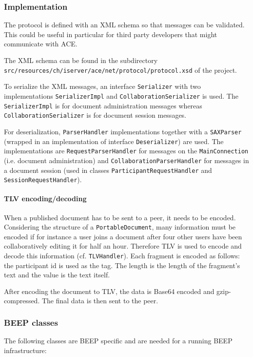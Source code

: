 \subsubsection{Implementation}
The protocol is defined with an XML schema so that messages can be validated. This could be useful in particular for third party developers that might communicate with ACE.

The XML schema can be found in the subdirectory \texttt{src/\-resources/\-ch/\-iserver/\-ace/\-net/\-protocol/\-protocol.xsd} of the project.

To serialize the XML messages, an interface \texttt{Serializer} with two implementations \texttt{SerializerImpl} and \texttt{CollaborationSerializer} is used. The \texttt{SerializerImpl} is for document administration messages whereas \texttt{CollaborationSerializer} is for document session messages.

For deserialization, \texttt{ParserHandler} implementations together with a \texttt{SAXParser} (wrapped in an implementation of interface \texttt{Deserializer}) are used. The implementations are \texttt{RequestParserHandler} for messages on the \texttt{MainConnection} (i.e. document administration) and \texttt{CollaborationParserHandler} for messages in a document session (used in classes \texttt{ParticipantRequestHandler} and \texttt{SessionRequestHandler}).


\paragraph{TLV encoding/decoding}
When a published document has to be sent to a peer, it needs to be encoded. Considering the structure of a \texttt{PortableDocument}, many information must be encoded if for instance a user joins a document after four other users have been collaboratively editing it for half an hour. Therefore TLV is used to encode and decode this information (cf. \texttt{TLVHandler}). Each fragment is encoded as follows: the participant id is used as the tag. The length is the length of the fragment's text and the value is the text itself. 

After encoding the document to TLV, the data is Base64 encoded and gzip-compressed. The final data is then sent to the peer.


\subsubsection{BEEP classes}
The following classes are BEEP specific and are needed for a running BEEP infrastructure:

